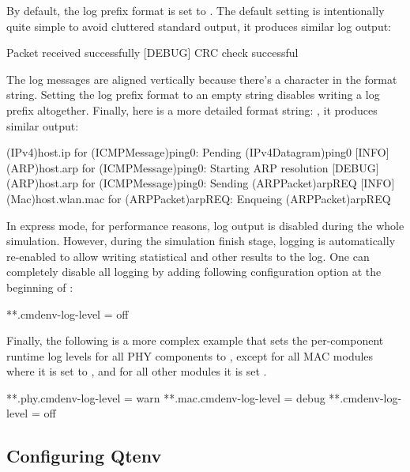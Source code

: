 By default, the log prefix format is set to . The
default setting is intentionally quite simple to avoid cluttered standard output,
it produces similar log output:

\begin{filelisting}
[INFO]  Packet received successfully
[DEBUG] CRC check successful
\end{filelisting}

The log messages are aligned vertically because there's a  character
in the format string. Setting the log prefix format to an empty string disables
writing a log prefix altogether. Finally, here is a more detailed format string:
, it produces similar output:

\begin{filelisting}
[INFO]  (IPv4)host.ip for (ICMPMessage)ping0:     Pending (IPv4Datagram)ping0
[INFO]  (ARP)host.arp for (ICMPMessage)ping0:     Starting ARP resolution
[DEBUG] (ARP)host.arp for (ICMPMessage)ping0:     Sending (ARPPacket)arpREQ
[INFO]  (Mac)host.wlan.mac for (ARPPacket)arpREQ: Enqueing (ARPPacket)arpREQ
\end{filelisting}

In express mode, for performance reasons, log output is disabled during the whole
simulation. However, during the simulation finish stage, logging is automatically
re-enabled to allow writing statistical and other results to the log. One can
completely disable all logging by adding following configuration option at the
beginning of :

\begin{inifile}
[General]
**.cmdenv-log-level = off
\end{inifile}

Finally, the following is a more complex example that sets the per-component
runtime log levels for all PHY components to , except for
all MAC modules where it is set to , and for all other
modules it is set .

\begin{inifile}
[General]
**.phy.cmdenv-log-level = warn
**.mac.cmdenv-log-level = debug
**.cmdenv-log-level = off
\end{inifile}

\subsection{Configuring Qtenv}
\label{sec:config-sim:configuring-qtenv}

